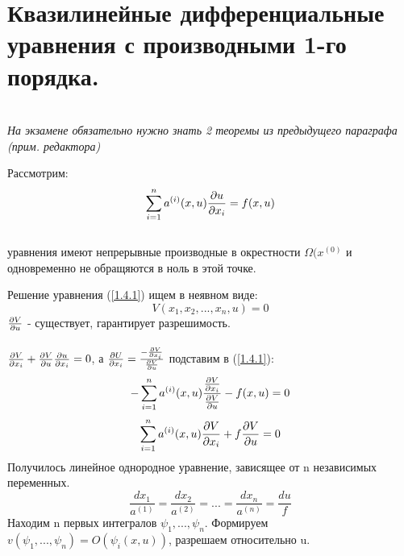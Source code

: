 \documentclass[../main.tex]{subfiles}
\begin{document}
\section{Квазилинейные дифференциальные уравнения с производными 1-го порядка.}
\\
\textit{На экзамене обязательно нужно знать 2 теоремы из предыдущего параграфа (прим. редактора)}
\\
\par Рассмотрим:
\begin{equation}\label{1.4.1}
\sum_{i=1}^{n}a^{(i)}(x,u)\frac{\partial u}{\partial x_i}=f(x,u)
\end{equation}
\\ уравнения имеют непрерывные производные в окрестности $\Omega(x^{(0)}$ и одновременно не обращяются в ноль в этой точке.\\

\par Решение уравнения (\ref{1.4.1}) ищем в неявном виде:
$$V(x_1,x_2,...,x_n,u)=0$$
$\frac{\partial V}{\partial u}$ - существует, гарантирует разрешимость.
\\ \\
$\frac{\partial V}{\partial x_i}+\frac{\partial V}{\partial u}\frac{\partial u}{\partial x_i} = 0$, а $\frac{\partial U}{\partial x_i} = \frac{-\frac{\partial V}{\partial x_i}}{\frac{\partial V}{\partial u}}$ подставим в (\ref{1.4.1}):\\

$$-\sum_{i=1}^{n}a^{(i)}(x,u)\frac{\frac{\partial V}{\partial x_i}}{\frac{\partial V}{\partial u}}-f(x,u)=0$$
$$\sum_{i=1}^{n}a^{(i)}(x,u)\frac{\partial V}{\partial x_i}+f\frac{\partial V}{\partial u} = 0$$
Получилось линейное однородное уравнение, зависящее от n независимых переменных.
$$\frac{dx_1}{a^{(1)}}=\frac{dx_2}{a^{(2)}}=...=\frac{dx_n}{a^{(n)}}=\frac{du}{f}$$
Находим n первых интегралов $\psi_1,...,\psi_n$. Формируем $v(\psi_1,...,\psi_n)=O(\psi_i(x,u))$, разрешаем относительно u.
\end{document}
